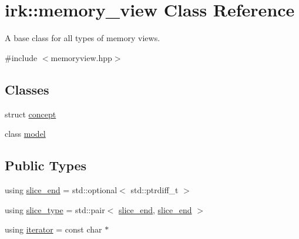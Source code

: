 \hypertarget{classirk_1_1memory__view}{}\section{irk\+:\+:memory\+\_\+view Class Reference}
\label{classirk_1_1memory__view}


A base class for all types of memory views.  




{\ttfamily \#include $<$memoryview.\+hpp$>$}

\subsection*{Classes}
\begin{DoxyCompactItemize}
\item 
struct \mbox{\hyperlink{structirk_1_1memory__view_1_1concept}{concept}}
\item 
class \mbox{\hyperlink{classirk_1_1memory__view_1_1model}{model}}
\end{DoxyCompactItemize}
\subsection*{Public Types}
\begin{DoxyCompactItemize}
\item 
using \mbox{\hyperlink{classirk_1_1memory__view_afbb67d0d922dfae3ea53d41706bd8eea}{slice\+\_\+end}} = std\+::optional$<$ std\+::ptrdiff\+\_\+t $>$
\item 
using \mbox{\hyperlink{classirk_1_1memory__view_ac0c1d9600bf81e8cb861a89ab104a43c}{slice\+\_\+type}} = std\+::pair$<$ \mbox{\hyperlink{classirk_1_1memory__view_afbb67d0d922dfae3ea53d41706bd8eea}{slice\+\_\+end}}, \mbox{\hyperlink{classirk_1_1memory__view_afbb67d0d922dfae3ea53d41706bd8eea}{slice\+\_\+end}} $>$
\item 
using \mbox{\hyperlink{classirk_1_1memory__view_a425bdc98ffa1c1c6cb018b3b4ad64317}{iterator}} = const char $\ast$
\end{DoxyCompactItemize}
